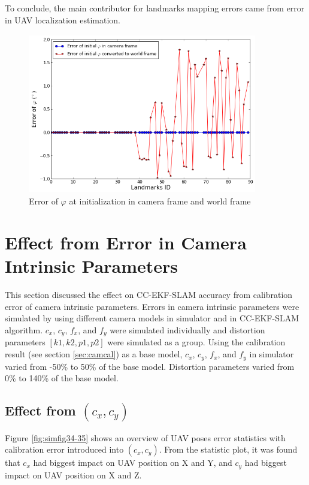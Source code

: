 To conclude, the main contributor for landmarks mapping errors came
from error in UAV localization estimation.

\begin{figure}[h] %
  \centering
  \includegraphics[width=10cm, height=7cm]{./Figures/SimulationFigures/Figure26.png}
  \caption{Error of $\varphi$ at initialization in camera frame and
    world frame}
  \label{fig:simfig26}
\end{figure}
\FloatBarrier

\section{Effect from Error in Camera Intrinsic Parameters}
This section discussed the effect on CC-EKF-SLAM accuracy from
calibration error of camera intrinsic parameters. Errors in camera
intrinsic parameters were simulated by using different 
camera models in simulator and in CC-EKF-SLAM algorithm.
$c_{x}$, $c_{y}$, $f_{x}$, and $f_{y}$ were simulated individually and
distortion parameters $[k1, k2, p1, p2]$ were simulated as a group.
Using the calibration result (see section \ref{sec:camcal}) as a
base model, $c_{x}$, $c_{y}$, $f_{x}$, and $f_{y}$ in simulator
varied from -50\% to 50\% of the base model. Distortion
parameters varied from 0\% to 140\% of the base model.

\subsection{Effect from $(c_{x}, c_{y})$}
Figure \ref{fig:simfig34-35} shows an overview of UAV poses error
statistics with calibration error introduced into $(c_{x}, c_{y})$. From
the statistic plot, it was found that $c_x$ had biggest impact on UAV
position on X and Y, and $c_y$ had biggest impact on UAV position on X
and Z.

